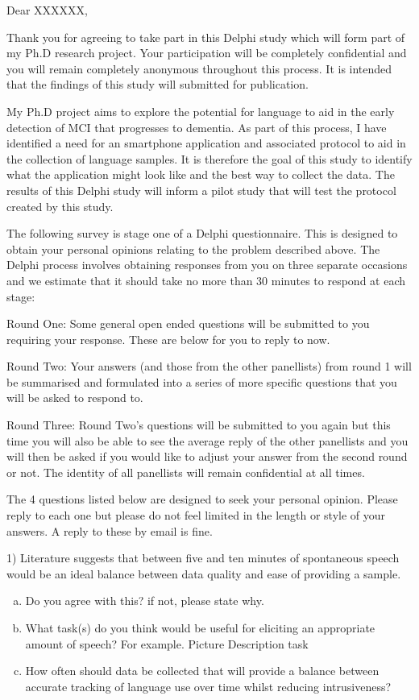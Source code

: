 \documentclass{letter}
\begin{document}
Dear XXXXXX, 

Thank you for agreeing to take part in this Delphi study which will form part of my Ph.D research project. Your participation will be completely confidential and you will remain completely anonymous throughout this process. It is intended that the findings of this study will submitted for publication. 

My Ph.D project aims to explore the potential for language to aid in the early detection of MCI that progresses to dementia. As part of this process, I have identified a need for an smartphone application and associated protocol to aid in the collection of language samples. It is therefore the goal of this study to identify what the application might look like and the best way to collect the data. The results of this Delphi study will inform a pilot study that will test the protocol created by this study.

The following survey is stage one of a Delphi questionnaire. This is designed to obtain your personal opinions relating to the problem described above. The Delphi process involves obtaining responses from you on three separate occasions and we estimate that it should take no more than 30 minutes to respond at each stage:

Round One: Some general open ended questions will be submitted to you requiring your response. These are below for you to reply to now. 

Round Two: Your answers (and those from the other panellists) from round 1 will be summarised and formulated into a series of more specific questions that you will be asked to respond to.

Round Three: Round Two’s questions will be submitted to you again but this time you will also be able to see the average reply of the other panellists and you will then be asked if you would like to adjust your answer from the second round or not. The identity of all panellists will remain confidential at all times.

The 4 questions listed below are designed to seek your personal opinion. Please reply to each one but please do not feel limited in the length or style of your answers. A reply to these by email is fine.

1) Literature suggests that between five and ten minutes of spontaneous speech would be an ideal balance between data quality and ease of providing a sample. 
\begin{enumerate}[(a)]
	\item Do you agree with this? if not, please state why.
	\item What task(s) do you think would be useful for eliciting an appropriate amount of speech? For example. Picture Description task
	\item How often should data be collected that will provide a balance between accurate tracking of language use over time whilst reducing intrusiveness?
\end{enumerate}
	
\end{document}
